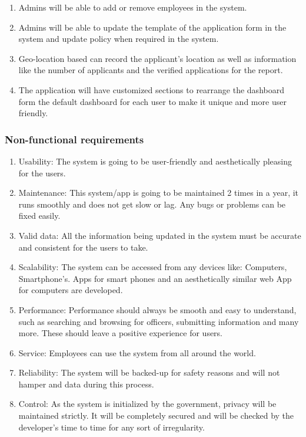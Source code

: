 \begin{enumerate}
\item Admins will be able to add or remove employees in the system.
\item Admins will be able to update the template of the application form in the system and update policy when required in the system.
\item Geo-location based can record the applicant’s location as well as information like the number of applicants and the verified applications for the report.
\item The application will have customized sections to rearrange the dashboard form the default dashboard for each user to make it unique and more user friendly.

\end{enumerate}

\subsubsection{Non-functional requirements} 
\begin{enumerate}
\item Usability: The system is going to be user-friendly and aesthetically pleasing for the users.
\item Maintenance: This system/app is going to be maintained 2 times in a year, it runs smoothly and does not get slow or lag. Any bugs or problems can be fixed easily.
\item Valid data: All the information being updated in the system must be accurate and consistent for the users to take.
\item Scalability: The system can be accessed from any devices like: Computers, Smartphone’s. Apps for smart phones and an aesthetically similar web App for computers are developed.
\item Performance: Performance should always be smooth and easy to understand, such as searching and browsing for officers, submitting information and many more. These should leave a positive experience for users.
\item Service: Employees can use the system from all around the world. 
\item Reliability: The system will be backed-up for safety reasons and will not hamper and data during this process.
\item Control: As the system is initialized by the government, privacy will be maintained strictly. It will be completely secured and will be checked by the developer’s time to time for any sort of irregularity. 

\end{enumerate}
